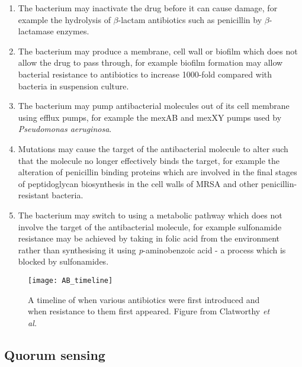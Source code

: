 \begin{enumerate}
\item The bacterium may inactivate the drug before it can cause damage, for example the hydrolysis of $\beta$-lactam antibiotics such as penicillin by $\beta$-lactamase enzymes.

\item The bacterium may produce a membrane, cell wall or biofilm which does not allow the drug to pass through, for example biofilm formation may allow bacterial resistance to antibiotics to increase 1000-fold compared with bacteria in suspension culture\cite{Stewart2001}.

\item The bacterium may pump antibacterial molecules out of its cell membrane using efflux pumps, for example the mexAB and mexXY pumps used by \textit{Pseudomonas aeruginosa}\cite{Poole2004}.

\item Mutations may cause the target of the antibacterial molecule to alter such that the molecule no longer effectively binds the target, for example the alteration of penicillin binding proteins which are involved in the final stages of peptidoglycan biosynthesis in the cell walls of MRSA and other penicillin-resistant bacteria\cite{Fuda2004}.

\item The bacterium may switch to using a metabolic pathway which does not involve the target of the antibacterial molecule, for example sulfonamide resistance may be achieved by taking in folic acid from the environment rather than synthesising it using \textit{p}-aminobenzoic acid - a process which is blocked by sulfonamides\cite{Skold2000}.

\end{enumerate}

\begin{figure}[H]
	\begin{center}
		\texttt{[image: AB\_timeline]}
		\caption{A timeline of when various antibiotics were first introduced and when resistance to them first appeared. Figure from Clatworthy \textit{et al.} \cite{Clatworthy2007} \label{fig:AB_timeline}}
	\end{center}
\end{figure}

\subsection{Quorum sensing}

